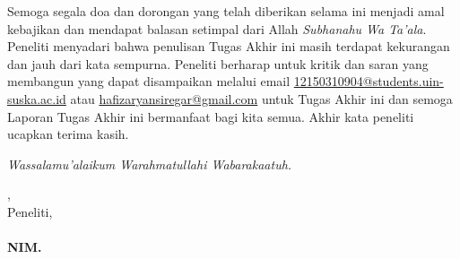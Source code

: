 Semoga segala doa dan dorongan yang telah diberikan selama ini menjadi amal kebajikan dan mendapat balasan setimpal dari Allah \textit{Subhanahu Wa Ta’ala}. Peneliti menyadari bahwa penulisan Tugas Akhir ini masih terdapat kekurangan dan jauh dari kata sempurna. Peneliti berharap untuk kritik dan saran yang membangun yang dapat disampaikan melalui email \href{mailto:12150310904@students.uin-suska.ac.id}{12150310904@students.uin-suska.ac.id} atau \href{mailto:hafizaryansiregar@gmail.com}{hafizaryansiregar@gmail.com} untuk Tugas Akhir ini dan semoga Laporan Tugas Akhir ini bermanfaat bagi kita semua. Akhir kata peneliti ucapkan terima kasih.

\textit{Wassalamu’alaikum Warahmatullahi Wabarakaatuh.}

\vspace*{0.1cm}



\begin{flushright}
	\kota, \tanggalPersetujuan\\
	Peneliti,\\
	\vspace{2cm}
	\textbf{\underline{\penulis}\\
		\vspace{-0.15cm}
		NIM. \nim}

\end{flushright}
